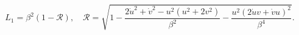 \begin{equation}\label{axisnbi}
 L_1=\beta ^2   (1- \mathcal{R}),\quad \mathcal{R}=\sqrt{1 -
  \frac{2\dot{u}^2+\dot{v}^2-u^2(u^2+2v^2)}{\beta^2}
 -\frac{u^2(2\dot{u}v+\dot{v}{u})^2}{\beta^4}}.
\end{equation}

